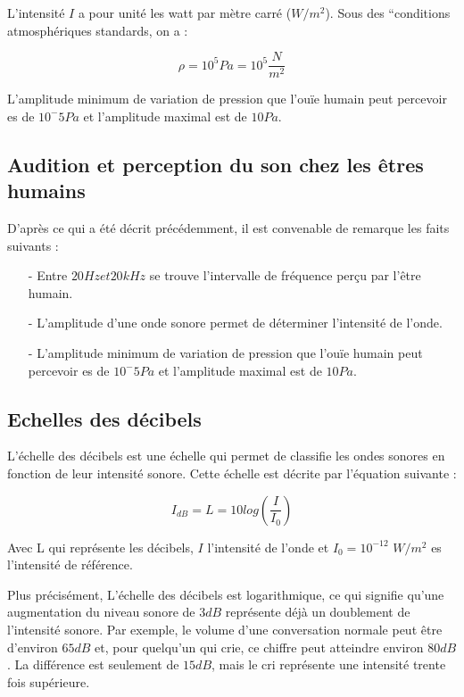 \documentclass[conference,onecolumn]{IEEEtran}
\begin{document}
L’intensité $I$ a pour unité les watt par mètre carré ($W/m^2$). Sous des “conditions atmosphériques standards, on a : 

\[\rho=10^5 Pa=10^5 \dfrac{N}{m^2}\]

L’amplitude minimum de variation de pression que l’ouïe humain peut percevoir es de $10^-5 Pa$ et l’amplitude maximal est de $10 Pa$. 

\subsection{Audition et perception du son chez les êtres humains}

D’après ce qui a été décrit précédemment, il est convenable de remarque les faits suivants :

\begin{itemize} %

    \item[-] Entre $20 Hz et 20 kHz$ se trouve l’intervalle de fréquence perçu par l’être humain.  

    \item[-] L’amplitude d’une onde sonore permet de déterminer l’intensité de l’onde. 

    \item[-] L’amplitude minimum de variation de pression que l’ouïe humain peut percevoir es de $10^-5 Pa$ et l’amplitude maximal est de $10 Pa$.

\end{itemize}

\subsection{Echelles des décibels}

L’échelle des décibels est une échelle qui permet de classifie les ondes sonores en fonction de leur intensité sonore. Cette échelle est décrite par l’équation suivante : 

\[I_{dB} = L = 10log(\dfrac{I}{I_0})\]

Avec L qui représente les décibels, $I$ l’intensité de l’onde et $I_0=10^{-12}$ $W/m^2$ es l’intensité de référence. 

Plus précisément, L’échelle des décibels est logarithmique, ce qui signifie qu’une augmentation du niveau sonore de $3 dB$ représente déjà un doublement de l’intensité sonore. Par exemple, le volume d’une conversation normale peut être d’environ $65 dB$ et, pour quelqu’un qui crie, ce chiffre peut atteindre environ $80 dB$. La différence est seulement de $15 dB$, mais le cri représente une intensité trente fois supérieure. 
\end{document}
